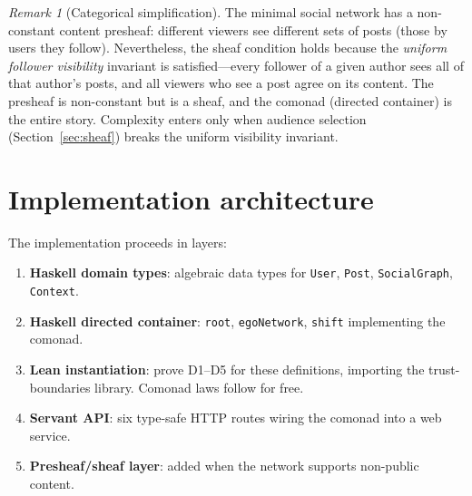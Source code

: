\documentclass[11pt,a4paper]{article}
\theoremstyle{definition}
\theoremstyle{plain}
\theoremstyle{remark}
\newtheorem{remark}[definition]{Remark}
\begin{document}
\begin{remark}[Categorical simplification]
The minimal social network has a non-constant content presheaf:
different viewers see different sets of posts (those by users they
follow). Nevertheless, the sheaf condition holds because the
\emph{uniform follower visibility} invariant is satisfied---every
follower of a given author sees all of that author's posts, and all
viewers who see a post agree on its content. The presheaf is
non-constant but is a sheaf, and the comonad (directed container) is
the entire story. Complexity enters only when audience selection
(Section~\ref{sec:sheaf}) breaks the uniform visibility invariant.
\end{remark}

\section{Implementation architecture}
\label{sec:architecture}

\begin{center}
\end{center}

The implementation proceeds in layers:

\begin{enumerate}[nosep]
  \item \textbf{Haskell domain types}: algebraic data types for
    \texttt{User}, \texttt{Post}, \texttt{SocialGraph}, \texttt{Context}.
  \item \textbf{Haskell directed container}: \texttt{root},
    \texttt{egoNetwork}, \texttt{shift} implementing the comonad.
  \item \textbf{Lean instantiation}: prove D1--D5 for these
    definitions, importing the trust-boundaries library. Comonad laws
    follow for free.
  \item \textbf{Servant API}: six type-safe HTTP routes wiring the
    comonad into a web service.
  \item \textbf{Presheaf/sheaf layer}: added when the network supports
    non-public content.
\end{enumerate}
\end{document}
